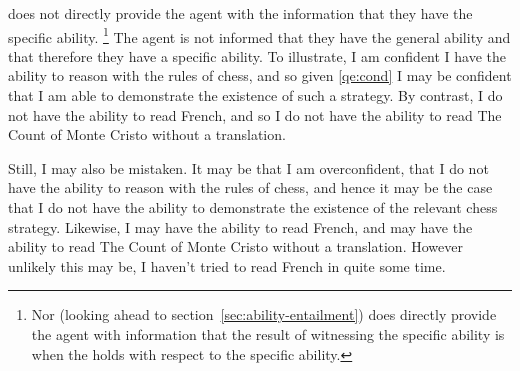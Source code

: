 \begin{note}
  \gsi{} does not directly provide the agent with the information that they have the specific ability.\nolinebreak
  \footnote{Nor (looking ahead to section~\ref{sec:ability-entailment}) does \gsi{} directly provide the agent with information that the result of witnessing the specific ability is when the \aben{} holds with respect to the specific ability.}
  The agent is not informed that they have the general ability and that therefore they have a specific ability.
  To illustrate, I am confident I have the ability to reason with the rules of chess, and so given \ref{qe:cond} I may be confident that I am able to demonstrate the existence of such a strategy.
  By contrast, I do not have the ability to read French, and so I do not have the ability to read The Count of Monte Cristo without a translation.

  Still, I may also be mistaken.
  It may be that I am overconfident, that I do not have the ability to reason with the rules of chess, and hence it may be the case that I do not have the ability to demonstrate the existence of the relevant chess strategy.
  Likewise, I may have the ability to read French, and may have the ability to read The Count of Monte Cristo without a translation.
  However unlikely this may be, I haven't tried to read French in quite some time.
\end{note}

